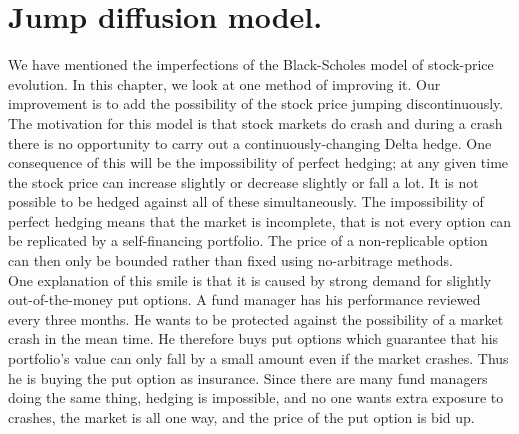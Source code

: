 \documentclass{book}
\begin{document}
\chapter{Jump diffusion model.}
We have mentioned the imperfections of the Black-Scholes model of stock-price evolution. In this chapter, we look at one method of improving it. Our improvement is to add the possibility of the stock price jumping discontinuously. The motivation for this model is that stock markets do crash and during a crash there is no opportunity to carry out a continuously-changing Delta hedge. One consequence of this will be the impossibility of perfect hedging; at any given time the stock price can increase slightly or decrease slightly or fall a lot. It is not possible to be hedged against all of these simultaneously. The impossibility of perfect hedging means that the market is incomplete, that is not every option can be replicated by a self-financing portfolio. The price of a non-replicable option can then only be bounded rather than fixed using no-arbitrage methods.\\
One explanation of this smile is that it is caused by strong demand for slightly out-of-the-money put options. A fund manager has his performance reviewed every three months. He wants to be protected against the possibility of a market crash in the mean time. He therefore buys put options which guarantee that his portfolio's value can only fall by a small amount even if the market crashes. Thus he is buying the put option as insurance. Since there are many fund managers doing the same thing, hedging is impossible, and no one wants extra exposure to crashes, the market is all one way, and the price of the put option is bid up.
\end{document}
